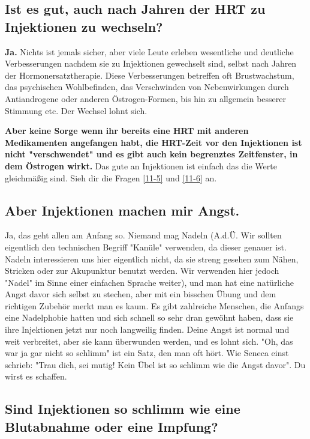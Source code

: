 \documentclass{article}
\begin{document}
\subsection{Ist es gut, auch nach Jahren der HRT zu Injektionen zu wechseln?}

\textbf{Ja.} Nichts ist jemals sicher, aber viele Leute erleben wesentliche und deutliche Verbesserungen nachdem sie zu Injektionen gewechselt sind, selbst nach Jahren der Hormonersatztherapie. Diese Verbesserungen betreffen oft Brustwachstum, das psychischen Wohlbefinden, das Verschwinden von Nebenwirkungen durch Antiandrogene oder anderen Östrogen-Formen, bis hin zu allgemein besserer Stimmung etc. Der Wechsel lohnt sich.

\textbf{Aber keine Sorge wenn ihr bereits eine HRT mit anderen Medikamenten angefangen habt, die HRT-Zeit vor den Injektionen ist nicht "verschwendet" und es gibt auch kein begrenztes Zeitfenster, in dem Östrogen wirkt.} Das gute an Injektionen ist einfach das die Werte gleichmäßig sind. Sieh dir die Fragen \ref{11-5} und \ref{11-6} an.

\subsection{Aber Injektionen machen mir Angst.}
Ja, das geht allen am Anfang so. Niemand mag Nadeln  (A.d.Ü. Wir sollten eigentlich den technischen Begriff "Kanüle" verwenden, da dieser genauer ist. Nadeln interessieren uns hier eigentlich nicht, da sie streng gesehen zum Nähen, Stricken oder zur Akupunktur benutzt werden. Wir verwenden hier jedoch "Nadel" im Sinne einer einfachen Sprache weiter), und man hat eine natürliche Angst davor sich selbst zu stechen, aber mit ein bisschen Übung und dem richtigen Zubehör merkt man es kaum. Es gibt zahlreiche Menschen, die Anfangs eine Nadelphobie hatten und sich schnell so sehr dran gewöhnt haben, dass sie ihre Injektionen jetzt nur noch langweilig finden. Deine Angst ist normal und weit verbreitet, aber sie kann überwunden werden, und es lohnt sich. "Oh, das war ja gar nicht so schlimm" ist ein Satz, den man oft hört. Wie Seneca einst schrieb: "Trau dich, sei mutig! Kein Übel ist so schlimm wie die Angst davor". Du wirst es schaffen.

\subsection{Sind Injektionen so schlimm wie eine Blutabnahme oder eine Impfung?}
\end{document}
